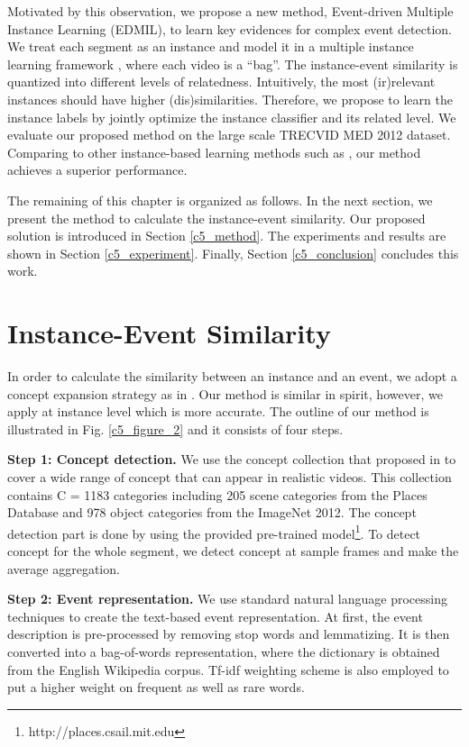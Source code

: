 Motivated by this observation, we propose a new method, Event-driven Multiple Instance Learning (EDMIL), to learn key evidences for complex event detection. We treat each segment as an instance and model it in a multiple instance learning framework \cite{andrews2002support}, where each video is a ``bag''. The instance-event similarity is quantized into different levels of relatedness. Intuitively, the most (ir)relevant instances should have higher (dis)similarities. Therefore, we propose to learn the instance labels by jointly optimize the instance classifier and its related level. We evaluate our proposed method on the large scale TRECVID MED 2012 dataset. Comparing to other instance-based learning methods such as \cite{andrews2002support,lai2014video}, our method achieves a superior performance.

The remaining of this chapter is organized as follows. In the next section, we present the method to calculate the instance-event similarity. Our proposed solution is introduced in Section \ref{c5_method}. The experiments and results are shown in Section \ref{c5_experiment}. Finally, Section \ref{c5_conclusion} concludes this work.

\section{Instance-Event Similarity}
\label{instance_event_similarity}
In order to calculate the similarity between an instance and an event, we adopt a concept expansion strategy as in \cite{chen2014event}. Our method is similar in spirit, however, we apply at instance level which is more accurate. The outline of our method is illustrated in Fig. \ref{c5_figure_2} and it consists of four steps.

\textbf{Step 1: Concept detection.} We use the concept collection that proposed in \cite{zhou2014learning} to cover a wide range of concept that can appear in realistic videos. This collection contains C = 1183 categories including 205 scene categories from the Places Database\cite{zhou2014learning} and 978 object categories from the ImageNet 2012\cite{deng2009imagenet}. The concept detection part is done by using the provided pre-trained model\footnote{http://places.csail.mit.edu}. To detect concept for the whole segment, we detect concept at sample frames and make the average aggregation.   

\textbf{Step 2: Event representation.} We use standard natural language processing techniques to create the text-based event representation. At first, the event description is pre-processed by removing stop words and lemmatizing. It is then converted into a bag-of-words representation, where the dictionary is obtained from the English Wikipedia corpus. Tf-idf weighting scheme is also employed to put a higher weight on frequent as well as rare words.   

